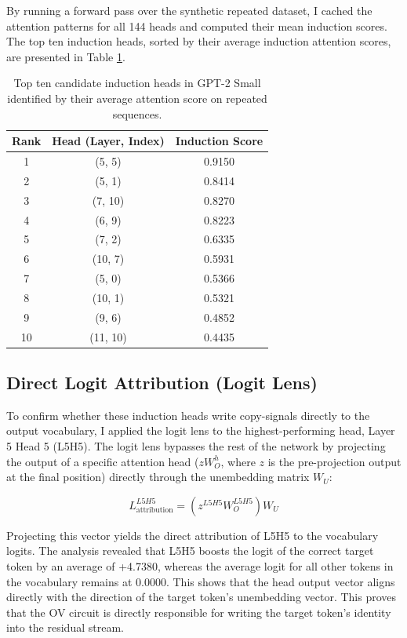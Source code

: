 \documentclass[11pt]{article}
\begin{document}
By running a forward pass over the synthetic repeated dataset, I cached the attention patterns for all 144 heads and computed their mean induction scores. The top ten induction heads, sorted by their average induction attention scores, are presented in Table \ref{tab:induction_heads}.

\begin{table}[h]
\centering
\begin{tabular}{ccc}
\toprule
\textbf{Rank} & \textbf{Head (Layer, Index)} & \textbf{Induction Score} \\
\midrule
1  & (5, 5)  & 0.9150 \\
2  & (5, 1)  & 0.8414 \\
3  & (7, 10) & 0.8270 \\
4  & (6, 9)  & 0.8223 \\
5  & (7, 2)  & 0.6335 \\
6  & (10, 7) & 0.5931 \\
7  & (5, 0)  & 0.5366 \\
8  & (10, 1) & 0.5321 \\
9  & (9, 6)  & 0.4852 \\
10 & (11, 10)& 0.4435 \\
\bottomrule
\end{tabular}
\caption{Top ten candidate induction heads in GPT-2 Small identified by their average attention score on repeated sequences.}
\label{tab:induction_heads}
\end{table}

\subsection{Direct Logit Attribution (Logit Lens)}

To confirm whether these induction heads write copy-signals directly to the output vocabulary, I applied the logit lens to the highest-performing head, Layer 5 Head 5 (L5H5). The logit lens bypasses the rest of the network by projecting the output of a specific attention head ($z W_O^h$, where $z$ is the pre-projection output at the final position) directly through the unembedding matrix $W_U$:

\begin{equation}
    L^{L5H5}_{\text{attribution}} = (z^{L5H5} W_O^{L5H5}) W_U
\end{equation}

Projecting this vector yields the direct attribution of L5H5 to the vocabulary logits. The analysis revealed that L5H5 boosts the logit of the correct target token by an average of +4.7380, whereas the average logit for all other tokens in the vocabulary remains at 0.0000. This shows that the head output vector aligns directly with the direction of the target token's unembedding vector. This proves that the OV circuit is directly responsible for writing the target token's identity into the residual stream.
\end{document}
